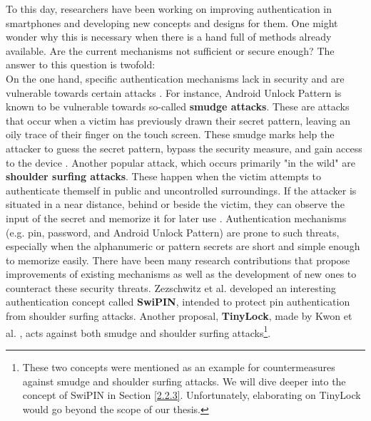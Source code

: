 To this day, researchers have been working on improving authentication in smartphones and developing new concepts and designs for them. One might wonder why this is necessary when there is a hand full of methods already available. Are the current mechanisms not sufficient or secure enough? The answer to this question is twofold:\\

On the one hand, specific authentication mechanisms lack in security and are vulnerable towards certain attacks \cite{Schloeglhofer}. For instance, Android Unlock Pattern is known to be vulnerable towards so-called \textbf{smudge attacks}. These are attacks that occur when a victim has previously drawn their secret pattern, leaving an oily trace of their finger on the touch screen. These smudge marks help the attacker to guess the secret pattern, bypass the security measure, and gain access to the device \cite{ediss20251}. Another popular attack, which occurs primarily "in the wild" are \textbf{shoulder surfing attacks}. These happen when the victim attempts to authenticate themself in public and uncontrolled surroundings. If the attacker is situated in a near distance, behind or beside the victim, they can observe the input of the secret and memorize it for later use \cite{ediss20251}. Authentication mechanisms (e.g. pin, password, and Android Unlock Pattern) are prone to such threats, especially when the alphanumeric or pattern secrets are short and simple enough to memorize easily. There have been many research contributions that propose improvements of existing mechanisms as well as the development of new ones to counteract these security threats. Zezschwitz et al. \cite{vonZezschwitz:2015:SFS:2702123.2702212} developed an interesting authentication concept called \textbf{SwiPIN}, intended to protect pin authentication from shoulder surfing attacks. Another proposal, \textbf{TinyLock}, made by Kwon et al. \cite{kwon}, acts against both smudge and shoulder surfing attacks\footnote{These two concepts were mentioned as an example for countermeasures against smudge and shoulder surfing attacks. We will dive deeper into the concept of SwiPIN \cite{Swipin} in Section \ref{2.2.3}. Unfortunately, elaborating on TinyLock \cite{kwon} would go beyond the scope of our thesis.}.\\


